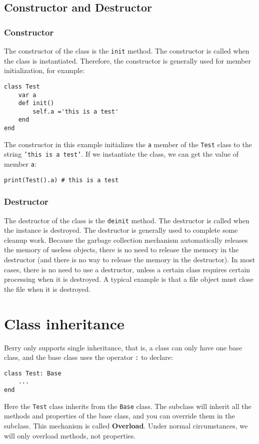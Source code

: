 \subsection {Constructor and Destructor}

\subsubsection {Constructor}The constructor of the class is the \texttt{init} method. The constructor is called when the class is instantiated. Therefore, the constructor is generally used for member initialization, for example:
\begin{lstlisting}[language=berry, numbers=none]
class Test
    var a
    def init()
        self.a ='this is a test'
    end
end
\end{lstlisting}
The constructor in this example initializes the \texttt{a} member of the \texttt{Test} class to the string \texttt{'this is a test'}. If we instantiate the class, we can get the value of member \texttt{a}:
\begin{lstlisting}[language=berry, numbers=none]
print(Test().a) # this is a test
\end{lstlisting}

\subsubsection {Destructor}

The destructor of the class is the \texttt{deinit} method. The destructor is called when the instance is destroyed. The destructor is generally used to complete some cleanup work. Because the garbage collection mechanism automatically releases the memory of useless objects, there is no need to release the memory in the destructor (and there is no way to release the memory in the destructor). In most cases, there is no need to use a destructor, unless a certain class requires certain processing when it is destroyed. A typical example is that a file object must close the file when it is destroyed.

\section {Class inheritance}

Berry only supports single inheritance, that is, a class can only have one base class, and the base class uses the operator \texttt{:} to declare:
\begin{lstlisting}[language=berry, numbers=none]
class Test: Base
    ...
end
\end{lstlisting}
Here the \texttt{Test} class inherits from the \texttt{Base} class. The subclass will inherit all the methods and properties of the base class, and you can override them in the subclass. This mechanism is called \textbf{Overload}. Under normal circumstances, we will only overload methods, not properties.

